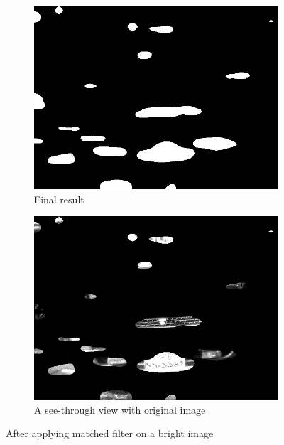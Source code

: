 \begin{figure}
\begin{subfigure}{0.5\textwidth}
    \centering
    \includegraphics[width=0.9\linewidth]{./img/experiment/stage.6/bumper}
    \caption{Final result}
\end{subfigure}
\begin{subfigure}{0.5\textwidth}
    \centering
    \includegraphics[width=0.9\linewidth]{./img/experiment/stage.6/-3-bumper}
    \caption{A see-through view with original image}
\end{subfigure}
\caption{After applying matched filter on a bright image}
\label{fig:MatchedResult3}
\end{figure}

